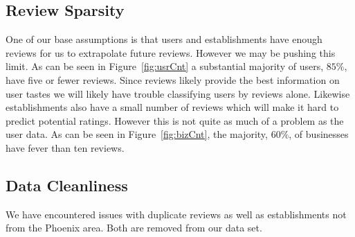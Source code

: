 \documentclass[10pt,twocolumn,letterpaper]{article}
\begin{document}
\subsection{Review Sparsity}
One of our base assumptions is that users and establishments have enough reviews for us to extrapolate future reviews. However we may be pushing this limit. As can be seen in Figure~\ref{fig:usrCnt} a substantial majority of users, $85\%$, have five or fewer reviews. Since reviews likely provide the best information on user tastes we will likely have trouble classifying users by reviews alone. Likewise establishments also have a small number of reviews which will make it hard to predict potential ratings. However this is not quite as much of a problem as the user data. As can be seen in Figure~\ref{fig:bizCnt}, the majority, $60\%$, of businesses have fever than ten reviews.

\subsection{Data Cleanliness}
We have encountered issues with duplicate reviews as well as establishments not from the Phoenix area. Both are removed from our data set.

{\small
}
\end{document}
